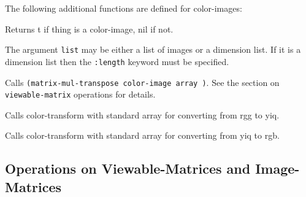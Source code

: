 The following additional functions are defined for color-images:
\begin{description}
\item{}
Returns t if thing is a color-image, nil if not.

\item{}
The argument {\tt list} may be either a list of images or a dimension
list.  If it is a dimension list then the {\tt :length} keyword must
be specified.

\item{}
Calls {\tt (matrix-mul-transpose color-image array \res \res)}.  See
the section on {\tt viewable-matrix} operations for details.

\item{}
Calls color-transform with standard array for converting from rgg to
yiq.

\item{}
Calls color-transform with standard array for converting from yiq to
rgb.
\end{description}



\subsection{Operations on Viewable-Matrices and Image-Matrices}


